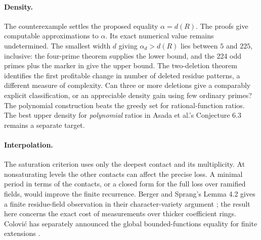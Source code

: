 \documentclass[11pt]{article}
\begin{document}
\paragraph{Density.}
The counterexample settles the proposed equality $\alpha=d(R)$. The proofs give computable approximations to $\alpha$. Its exact numerical value remains undetermined. The smallest width $d$ giving $\alpha_d>d(R)$ lies between $5$ and $225$, inclusive: the four-prime theorem supplies the lower bound, and the 224 odd primes plus the marker in \cite{incomingmc} give the upper bound. The two-deletion theorem identifies the first profitable change in number of deleted residue patterns, a different measure of complexity. Can three or more deletions give a comparably explicit classification, or an appreciable density gain using few ordinary primes? The polynomial construction beats the greedy set for rational-function ratios. The best upper density for \emph{polynomial} ratios in Asada et al.'s Conjecture 6.3 remains a separate target.
\paragraph{Interpolation.}
The saturation criterion uses only the deepest contact and its multiplicity. At nonsaturating levels the other contacts can affect the precise loss. A minimal period in terms of the contacts, or a closed form for the full loss over ramified fields, would improve the finite recurrence. Berger and Sprang's Lemma 4.2 gives a finite residue-field observation in their character-variety argument \cite{bs}; the result here concerns the exact cost of measurements over thicker coefficient rings. Colovi\'c has separately announced the global bounded-functions equality for finite extensions \cite{colovic}.
\end{document}
